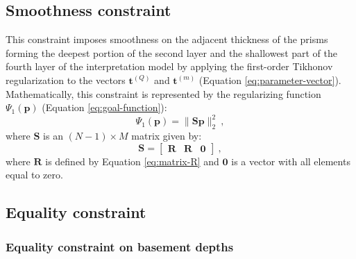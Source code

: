 \documentclass[manuscript]{geophysics}
\begin{document}
\subsection{Smoothness constraint}


This constraint imposes smoothness on the adjacent thickness of the prisms forming the
deepest portion of the second layer and the shallowest part of the fourth layer
of the interpretation model by applying the first-order Tikhonov regularization
\citep{aster-etal2005} to the vectors $\mathbf{t}^{(Q)}$ and $\mathbf{t}^{(m)}$ 
(Equation \ref{eq:parameter-vector}). 
Mathematically, this constraint is represented by the regularizing function
$\Psi_{1}(\mathbf{p})$ (Equation \ref{eq:goal-function}):
\begin{equation}
\Psi_{1}(\mathbf{p}) = \| \mathbf{S}\mathbf{p} \|_{2}^{2} \: ,
\label{eq:smootheness-contraint}
\end{equation}
where $\mathbf{S}$ is an $\left( N-1 \right) \times M$ matrix given by:
\begin{equation}
\mathbf{S} = \begin{bmatrix}
\mathbf{R} & \mathbf{R} & \mathbf{0}
\end{bmatrix} \: ,
\label{eq:matrix-S}
\end{equation}
where $\mathbf{R}$ is defined by Equation \ref{eq:matrix-R} and $\mathbf{0}$
is a vector with all elements equal to zero.


\subsection{Equality constraint}

\subsubsection*{Equality constraint on basement depths}
\end{document}
